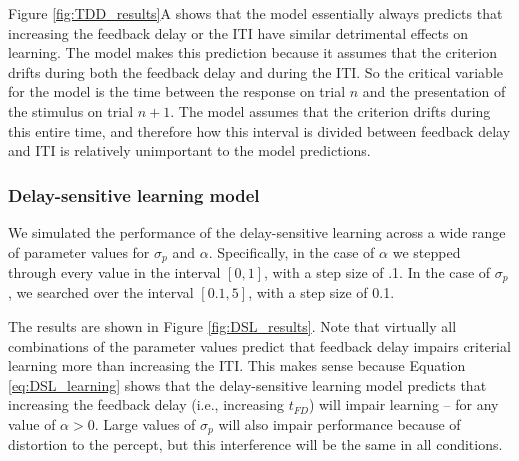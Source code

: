 \documentclass[doc, floatsintext]{apa7}
\begin{document}
Figure \ref{fig:TDD_results}A shows that the model
essentially always predicts that increasing the feedback
delay or the ITI have similar detrimental effects on
learning. The model makes this prediction because it assumes
that the criterion drifts during both the feedback delay and
during the ITI. So the critical variable for the model is
the time between the response on trial $n$ and the
presentation of the stimulus on trial $n+1$. The model
assumes that the criterion drifts during this entire time,
and therefore how this interval is divided between feedback
delay and ITI is relatively unimportant to the model
predictions. 

\subsubsection{Delay-sensitive learning model}
We simulated the performance of the delay-sensitive learning
across a wide range of parameter values for $\sigma_p$ and
$\alpha$. Specifically, in the case of $\alpha$ we stepped
through every value in the interval $[0, 1]$, with a step
size of .1. In the case of $\sigma_p$, we searched over the
interval $[0.1, 5]$, with a step size of 0.1. 

The results are shown in Figure \ref{fig:DSL_results}. Note
that virtually all combinations of the parameter values
predict that feedback delay impairs criterial learning more
than increasing the ITI. This makes sense because Equation
\ref{eq:DSL_learning} shows that the delay-sensitive
learning model predicts that increasing the feedback delay
(i.e., increasing $t_{FD}$) will impair learning -- for any
value of $\alpha>0$. Large values of $\sigma_p$ will also
impair performance because of distortion to the percept, but
this interference will be the same in all conditions.
\end{document}
